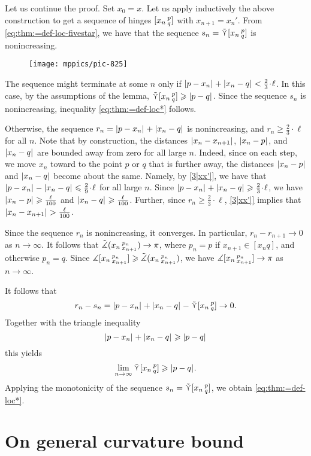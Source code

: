 \medskip

Let us continue the proof.
Set $x_0=x$.
Let us apply inductively the above construction to get a sequence of hinges  $[x_n\,{}^{p}_{q}]$ with $x_{n+1}=x_n'$.
From \ref{eq:thm:=def-loc-fivestar}, we have that the sequence  $s_n\z=\side \hinge{x_n}p q$ is nonincreasing.
\begin{figure}[ht!]
\centering
\texttt{[image: mppics/pic-825]}
\end{figure}

The sequence might terminate at some $n$ only if $\dist{p}{x_n}{}+\dist{x_n}{q}{}\z< \tfrac{2}{3}\cdot\ell $.
In this case, by the assumptions of the lemma, $\side \hinge{x_n}p q\ge\dist{p}{q}{}$.
Since the sequence $s_n$ is nonincreasing, inequality \ref{eq:thm:=def-loc*} follows.

Otherwise, the sequence $r_n=\dist{p}{x_n}{}+\dist{x_n}{q}{}$ is nonincreasing, and $r_n\ge\tfrac{2}{3}\cdot\ell$ for all $n$.
Note that by construction, the distances
$\dist{x_n}{x_{n+1}}{}$, $\dist{x_n}{p}{}$, and $\dist{x_n}{q}{}$ are bounded away from zero for all large $n$.
Indeed, since on each step, we move $x_n$ toward to the point $p$ or $q$ that is further away, the distances $\dist{x_n}{p}{}$ and $\dist{x_n}{q}{}$ become about the same.
Namely, by \ref{3|xx'|}, we have that $\dist{p}{x_n}{}-\dist{x_n}{q}{}\le \tfrac29\cdot\ell$ for all large $n$.
Since $\dist{p}{x_n}{}+\dist{x_n}{q}{}\ge \tfrac23\cdot\ell$, we have $\dist{x_n}{p}{}\ge \tfrac\ell{100}$ and $\dist{x_n}{q}{}\ge \tfrac\ell{100}$.
Further, since $r_n\ge\tfrac{2}{3}\cdot\ell$, \ref{3|xx'|} implies that $\dist{x_n}{x_{n+1}}{}>\tfrac\ell{100}$.


Since the sequence $r_n$ is nonincreasing, it converges.
In particular, $r_n-r_{n+1}\to 0$ as $n\to\infty$.
It follows that $\tilde\measuredangle(x_n\,{}^{p_n}_{x_{n+1}})\to \pi$,
where $p_n=p$ if $x_{n+1}\in [x_nq]$, and otherwise $p_n=q$.
Since $\measuredangle[x_n\,{}^{p_n}_{x_{n+1}}]\geqslant\tilde\measuredangle(x_n\,{}^{p_n}_{x_{n+1}})$, we have
$\measuredangle[x_n\,{}^{p_n}_{x_{n+1}}]\to \pi$  as $n\to\infty$.

It follows that
\[r_n-s_n=\dist{p}{x_n}{}+\dist{x_n}{q}{}-\side \hinge{x_n}p q\to 0.\] 
Together with the triangle inequality
\[
\dist{p}{x_n}{}+\dist{x_n}{q}{}\ge\dist{p}{q}{}
\]
this yields
\[\lim_{n\to\infty}\side \hinge{x_n}p q\ge \dist{p}{q}{}.\]
Applying the monotonicity of the sequence $s_n=\mathop{\tilde\curlyvee}\nolimits [x_n\,{}^{p}_{q}]$, we obtain \ref{eq:thm:=def-loc*}.
\qeds

\section{On general curvature bound}

